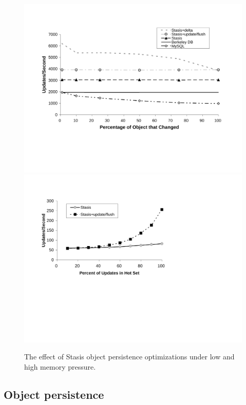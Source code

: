 \documentclass[letterpaper,twocolumn,10pt]{article}
\newcommand{\yad}{Stasis\xspace}
\begin{document}
\begin{figure}
\includegraphics[width=1\columnwidth]{figs/object-diff.pdf}
\hspace{.2in}
\includegraphics[width=1\columnwidth]{figs/mem-pressure.pdf}
\vspace{-.15in}
\caption{\sf \label{fig:OASYS}
The effect of \yad object persistence optimizations under low and high memory pressure.}
\end{figure}


\subsection{Object persistence}
\label{sec:oasys}
\end{document}
